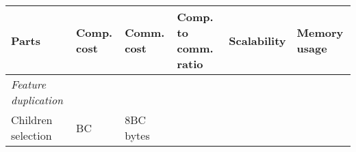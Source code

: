 \documentclass[10pt,oneside]{memoir}
\begin{document}
\begin{longtable}[]{@{}llllll@{}}
\toprule
\begin{minipage}[b]{0.19\columnwidth}\raggedright
Parts\strut
\end{minipage} & \begin{minipage}[b]{0.10\columnwidth}\raggedright
Comp. cost\strut
\end{minipage} & \begin{minipage}[b]{0.13\columnwidth}\raggedright
Comm. cost\strut
\end{minipage} & \begin{minipage}[b]{0.19\columnwidth}\raggedright
Comp. to comm. ratio\strut
\end{minipage} & \begin{minipage}[b]{0.11\columnwidth}\raggedright
Scalability\strut
\end{minipage} & \begin{minipage}[b]{0.12\columnwidth}\raggedright
Memory usage\strut
\end{minipage}\tabularnewline
\midrule
\endhead
\begin{minipage}[t]{0.19\columnwidth}\raggedright
\emph{Feature duplication}\strut
\end{minipage} & \begin{minipage}[t]{0.10\columnwidth}\raggedright
\strut
\end{minipage} & \begin{minipage}[t]{0.13\columnwidth}\raggedright
\strut
\end{minipage} & \begin{minipage}[t]{0.19\columnwidth}\raggedright
\strut
\end{minipage} & \begin{minipage}[t]{0.11\columnwidth}\raggedright
\strut
\end{minipage} & \begin{minipage}[t]{0.12\columnwidth}\raggedright
\strut
\end{minipage}\tabularnewline
\begin{minipage}[t]{0.19\columnwidth}\raggedright
Children selection\strut
\end{minipage} & \begin{minipage}[t]{0.10\columnwidth}\raggedright
BC\strut
\end{minipage} & \begin{minipage}[t]{0.13\columnwidth}\raggedright
8BC bytes\strut
\end{minipage} & \begin{minipage}[t]{0.19\columnwidth}\raggedright

\end{minipage}
\end{longtable}
\end{document}
